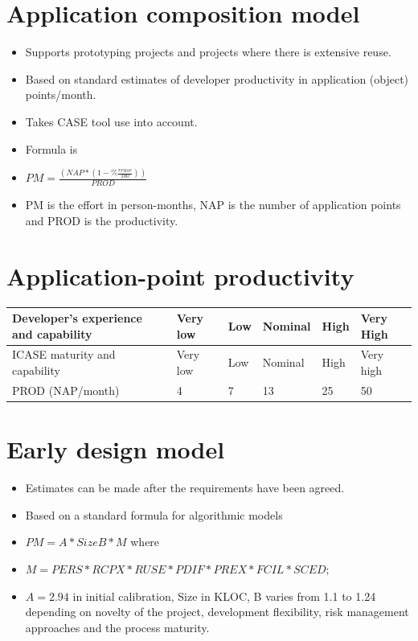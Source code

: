 \section{Application composition model}
\begin{itemize}
\item Supports prototyping projects and projects where there is extensive reuse.

\item Based on standard estimates of developer productivity in application (object) points/month.

\item Takes CASE tool use into account.

\item Formula is

  \item $ PM = \frac{( NAP * (1 - \% \frac{reuse}{100} ) )}{PROD}$

  \item PM is the effort in person-months, NAP is the number of application points and PROD is the productivity.
\end{itemize}

\newpage
\section{Application-point productivity}
\begin{table}[h!]
\centering
\begin{tabular}{ |p{2cm}|p{1cm}|p{1cm}|p{1cm}|p{1cm}|p{1cm}|  }
\hline
Developer’s experience and capability &  Very low & Low & Nominal & High & Very High\\
\hline
\hline
ICASE maturity and capability & Very low & Low & Nominal & High & Very high\\
\hline
PROD (NAP/month) & 4 & 7 & 13 & 25 & 50\\
\hline
\end{tabular}

\label{table:T6_3}
\end{table}

\section{Early design model}
\begin{itemize}

\item Estimates can be made after the requirements have been agreed.

\item Based on a standard formula for algorithmic models
\item $PM = A * SizeB * M$ where
  \item $M = PERS * RCPX * RUSE * PDIF * PREX * FCIL * SCED;$
  \item $A = 2.94$ in initial calibration, Size in KLOC, B varies from 1.1 to 1.24 depending on novelty of the project, development flexibility, risk management approaches and the process maturity.
\end{itemize}
